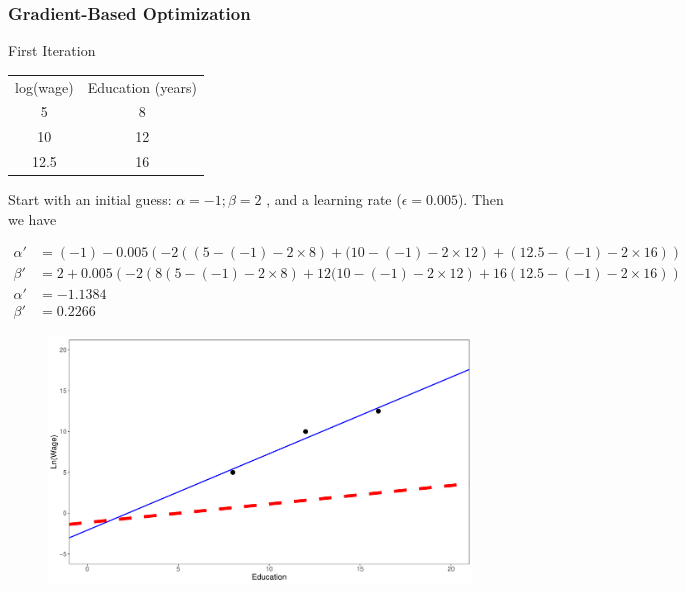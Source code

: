 \documentclass[
  shownotes,
  xcolor={svgnames},
  hyperref={colorlinks,citecolor=DarkBlue,linkcolor=DarkRed,urlcolor=DarkBlue}
  , aspectratio=169]{beamer}
\begin{document}
\begin{frame}[fragile]
\frametitle{Gradient-Based Optimization}
\tiny
First Iteration
\begin{table}[]
\begin{tabular}{cc}
log(wage) & Education (years) \\
5         & 8                                                         \\
10        & 12                                                          \\
12.5      & 16                                                          \\
\end{tabular}
\end{table}

Start with an initial guess: $\alpha=-1;\beta=2$ , and a learning rate ($\epsilon=0.005$). Then we have

\begin{align}
\alpha' &=(-1)-0.005\left(-2\left((5-(-1)-2\times8)+(10-(-1)-2\times12\right)+(12.5-(-1)-2\times16)\right) \nonumber \\
\beta' &=2+0.005\left(-2\left(8(5-(-1)-2\times8)+12(10-(-1)-2\times12\right)+16(12.5-(-1)-2\times16)\right) \nonumber \\
\alpha'&=-1.1384 \nonumber \\
\beta' &=0.2266 \nonumber
\end{align}





    
        \begin{figure}[H] \centering
            \captionsetup{justification=centering}  
            \includegraphics[scale=0.15]{figures/fig_1_2.pdf}
    \end{figure}




\end{frame}
\end{document}
